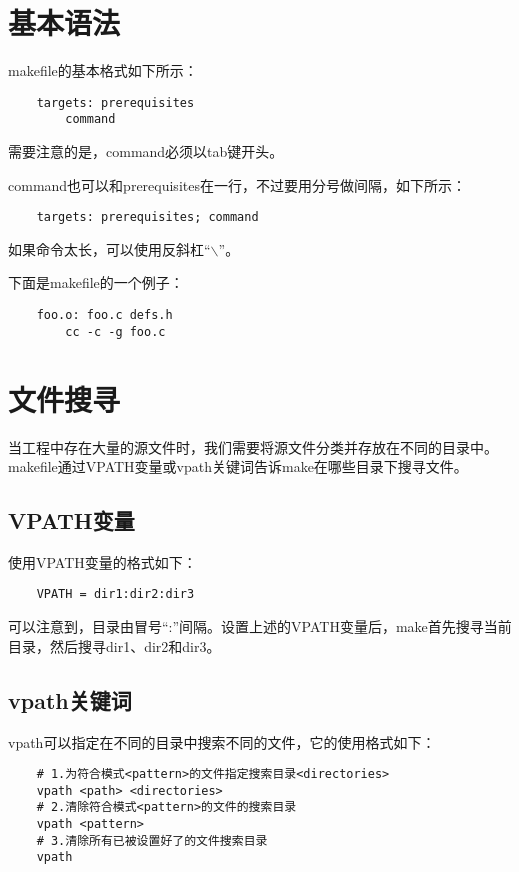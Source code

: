 \documentclass[a4paper,left=2.5cm,right=2.5cm,11pt]{article}
\begin{document}
\tableofcontents

\clearpage

\section{基本语法}
	makefile的基本格式如下所示：
	\begin{lstlisting}
	targets: prerequisites
		command
	\end{lstlisting}

	需要注意的是，command必须以tab键开头。\par
	command也可以和prerequisites在一行，不过要用分号做间隔，如下所示：
	\begin{lstlisting}
	targets: prerequisites; command
	\end{lstlisting}

	如果命令太长，可以使用反斜杠“$\backslash$”。\par

	下面是makefile的一个例子：
	\begin{lstlisting}
	foo.o: foo.c defs.h
		cc -c -g foo.c
	\end{lstlisting}

\section{文件搜寻}
	当工程中存在大量的源文件时，我们需要将源文件分类并存放在不同的目录中。
	makefile通过VPATH变量或vpath关键词告诉make在哪些目录下搜寻文件。

\subsection{VPATH变量}
	使用VPATH变量的格式如下：
	\begin{lstlisting}
	VPATH = dir1:dir2:dir3
	\end{lstlisting}

	可以注意到，目录由冒号“:”间隔。设置上述的VPATH变量后，make首先搜寻当前目录，然后搜寻dir1、dir2和dir3。

\subsection{vpath关键词}
	vpath可以指定在不同的目录中搜索不同的文件，它的使用格式如下：
	\begin{lstlisting}
	# 1.为符合模式<pattern>的文件指定搜索目录<directories>
	vpath <path> <directories>
	# 2.清除符合模式<pattern>的文件的搜索目录
	vpath <pattern>
	# 3.清除所有已被设置好了的文件搜索目录
	vpath
	\end{lstlisting}
\end{document}
